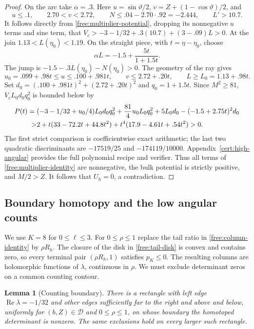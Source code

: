\documentclass[11pt]{article}
\numberwithin{equation}{section}
\newtheorem{lemma}[theorem]{Lemma}
\theoremstyle{definition}
\theoremstyle{remark}
\begin{document}
\begin{proof}
On the arc take $\alpha=.3$.  Here
$u=\sin\vartheta/2$, $v=Z+(1-\cos\vartheta)/2$, and
\[
 u\le.1,\qquad 2.70<v<2.72,\qquad
 N\le.04-2.70\cdot.92=-2.444,
 \qquad L'>10.7.
\]
It follows directly from \eqref{free:multiplier-potential}, dropping
its nonnegative $u$ terms and sine term, that
$V_c>-3-1/32+.3(10.7)+(3-.09)L>0$.
At the join $1.13<L(\eta_0)<1.19$.  On the straight piece, with
$t=\eta-\eta_0$, choose
\[
 \alpha L=-1.5+\frac{5t}{1+1.5t}.
\]
The jump is $-1.5-.3L(\eta_0)-N(\eta_0)>0$.
The geometry of the ray gives
\[
 u_0=.099+.98t\le u\le.100+.981t,\qquad
 v\le2.72+.20t,\qquad L\ge L_0=1.13+.98t.
\]
Set $d_0=(.100+.981t)^2+(2.72+.20t)^2$ and $q_0=1+1.5t$.
Since $M^2\ge81$, $V_cL_0d_0q_0^2$ is bounded below by
\begin{align}\label{free:high-polynomial}
 P(t)={}&(-3-1/32+u_0/4)L_0d_0q_0^2
 +\frac{81}{4}u_0L_0q_0^2+5L_0d_0
 -(-1.5+2.75t)^2d_0\notag\\
 >&2+t(33-72.2t+44.8t^2)
       +t^4(17.9-4.61t+.54t^2)>0.
\end{align}
The first strict comparison is coefficientwise exact arithmetic; the
last two quadratic discriminants are $-17519/25$ and
$-174119/10000$.  Appendix~\ref{cert:high-angular} provides the full
polynomial recipe and verifier.  Thus all terms of
\eqref{free:multiplier-identity} are nonnegative, the bulk potential is
strictly positive, and $M/2>Z$.  It follows that $U_h=0$, a
contradiction.
\end{proof}

\subsection{Boundary homotopy and the low angular counts}

We use $K=8$ for $0\le\ell\le3$.  For $0\le\rho\le1$ replace the tail
ratio in \eqref{free:column-identity} by $\rho R_h$.  The closure of
the disk in \eqref{free:tail-disk} is convex and contains zero, so every terminal
pair $(\rho R_h,1)$ satisfies $p_K\le0$.  The resulting columns are
holomorphic functions of $\lambda$, continuous in $\rho$.  We must
exclude determinant zeros on a common counting contour.

\begin{lemma}[Counting boundary]\label{free:boundary}
There is a rectangle with left edge $\operatorname{Re}\lambda=-1/32$
and other edges sufficiently far to the right and above and below,
uniformly for $(b,Z)\in\mathcal D$ and $0\le\rho\le1$, on whose
boundary the homotoped determinant is nonzero.  The same exclusions
hold on every larger such rectangle.
\end{lemma}
\end{document}
